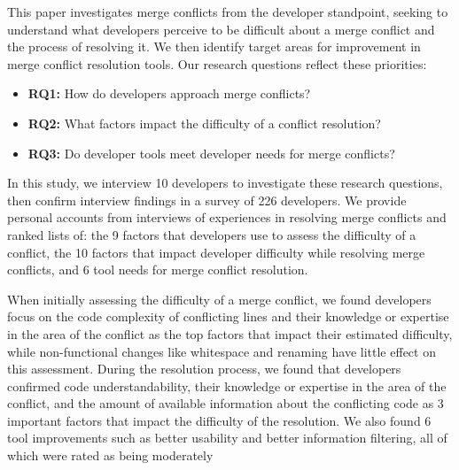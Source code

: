 This paper investigates merge conflicts from the developer standpoint, seeking to understand what developers perceive to be difficult about a merge conflict and the process of resolving it. We then identify target areas for improvement in merge conflict resolution tools. Our research questions reflect these priorities: 

\begin{itemize}
\item\textbf{RQ1:} How do developers approach merge conflicts?\\
\item\textbf{RQ2:} What factors impact the difficulty of a conflict resolution?\\
\item\textbf{RQ3:} Do developer tools meet developer needs for merge conflicts?\\
\end{itemize}

In this study, we interview 10 developers to investigate these research questions, then confirm interview findings in a survey of 226 developers. We provide personal accounts from interviews of experiences in resolving merge conflicts and ranked lists of: the 9 factors that developers use to assess the difficulty of a conflict, the 10 factors that impact developer difficulty while resolving merge conflicts, and 6 tool needs for merge conflict resolution.

When initially assessing the difficulty of a merge conflict, we found developers focus on the code complexity of conflicting lines and their knowledge or expertise in the area of the conflict as the top factors that impact their estimated difficulty, while non-functional changes like whitespace and renaming have little effect on this assessment. 
During the resolution process, we found that developers confirmed code understandability, their knowledge or expertise in the area of the conflict, and the amount of available information about the conflicting code as 3 important factors that impact the difficulty of the resolution.
We also found 6 tool improvements such as better usability and better information filtering, all of which were rated as being moderately 
